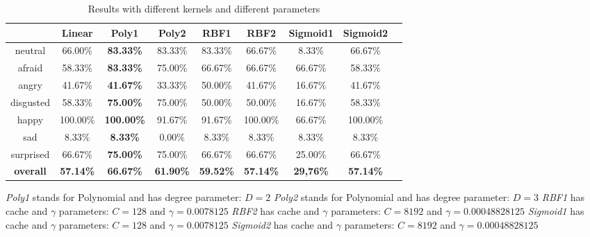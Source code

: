 \begin{table}[h]
\begin{center}
   \caption{\label{table_results_kernels} Results with different kernels and different parameters}
\begin{tabular}{|c|c|c|c|c|c|c|c|c|}
  \hline
    & Linear & \textbf{Poly1} & Poly2 & RBF1 & RBF2 & Sigmoid1 & Sigmoid2 \\
  \hline
  neutral & 66.00\% & \textbf{83.33\%} & 83.33\% & 83.33\% & 66.67\% & 8.33\% & 66.67\% \\
  afraid & 58.33\% & \textbf{83.33\%} & 75.00\% & 66.67\% & 66.67\% & 66.67\% & 58.33\% \\
  angry & 41.67\% & \textbf{41.67\%} & 33.33\% & 50.00\% & 41.67\% & 16.67\% & 41.67\% \\
  disgusted & 58.33\% & \textbf{75.00\%} & 75.00\% & 50.00\% & 50.00\% & 16.67\% & 58.33\% \\
  happy & 100.00\% & \textbf{100.00\%} & 91.67\% & 91.67\% & 100.00\% & 66.67\% & 100.00\% \\
  sad & 8.33\% & \textbf{8.33\%} & 0.00\% & 8.33\% & 8.33\% & 8.33\% & 8.33\% \\
  surprised & 66.67\% & \textbf{75.00\%} & 75.00\% & 66.67\% & 66.67\% & 25.00\% & 66.67\% \\
  \textbf{overall} & \textbf{57.14\%} & \textbf{66.67\%} & \textbf{61.90\%} & \textbf{59.52\%} & \textbf{57.14\%} & \textbf{29,76\%} & \textbf{57.14\%} \\
  \hline
\end{tabular}
\end{center} 
\end{table}

\noindent \textit{Poly1} stands for Polynomial and has degree parameter: $ D = 2 $
\newline
\noindent \textit{Poly2} stands for Polynomial and has degree parameter: $ D = 3 $
\newline
\noindent \textit{RBF1} has cache and $\gamma$ parameters: $ C = 128 $ and $ \gamma = 0.0078125 $
\newline
\noindent \textit{RBF2} has cache and $\gamma$ parameters: $ C = 8192 $ and $ \gamma = 0.00048828125 $ 
\newline
\noindent \textit{Sigmoid1} has cache and $\gamma$ parameters: $ C = 128 $ and $ \gamma = 0.0078125 $
\newline
\noindent \textit{Sigmoid2} has cache and $\gamma$ parameters: $ C = 8192 $ and $ \gamma = 0.00048828125 $
\newline

